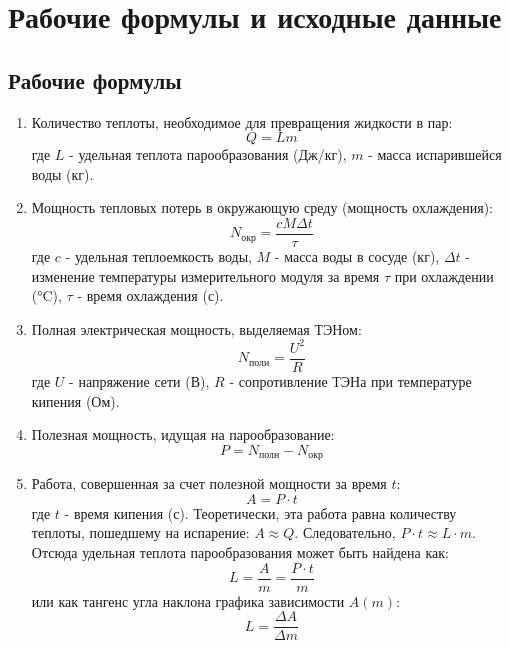 \documentclass[12pt, a4paper]{article}
\begin{document}
\section{Рабочие формулы и исходные данные}
\subsection*{Рабочие формулы}
\begin{enumerate}
    \item Количество теплоты, необходимое для превращения жидкости в пар:
    \begin{equation} \label{eq:Q_Lm}
        Q = Lm
    \end{equation}
    где $L$ - удельная теплота парообразования (Дж/кг), $m$ - масса испарившейся воды (кг).

    \item Мощность тепловых потерь в окружающую среду (мощность охлаждения):
    \begin{equation} \label{eq:N_okr}
        N_{\text{окр}} = \frac{cM\Delta t}{\tau}
    \end{equation}
    где $c$ - удельная теплоемкость воды, $M$ - масса воды в сосуде (кг), $\Delta t$ - изменение температуры измерительного модуля за время $\tau$ при охлаждении (°C), $\tau$ - время охлаждения (с).

    \item Полная электрическая мощность, выделяемая ТЭНом:
    \begin{equation} \label{eq:N_poln}
        N_{\text{полн}} = \frac{U^2}{R}
    \end{equation}
    где $U$ - напряжение сети (В), $R$ - сопротивление ТЭНа при температуре кипения (Ом).

    \item Полезная мощность, идущая на парообразование:
    \begin{equation} \label{eq:P}
        P = N_{\text{полн}} - N_{\text{окр}}
    \end{equation}

    \item Работа, совершенная за счет полезной мощности за время $t$:
    \begin{equation} \label{eq:A_Pt}
        A = P \cdot t
    \end{equation}
    где $t$ - время кипения (с).
    Теоретически, эта работа равна количеству теплоты, пошедшему на испарение: $A \approx Q$. Следовательно, $P \cdot t \approx L \cdot m$. Отсюда удельная теплота парообразования может быть найдена как:
    \begin{equation} \label{eq:L_At_m}
        L = \frac{A}{m} = \frac{P \cdot t}{m}
    \end{equation}
    или как тангенс угла наклона графика зависимости $A(m)$:
    \begin{equation} \label{eq:L_slope}
        L = \frac{\Delta A}{\Delta m}
    \end{equation}
\end{enumerate}
\end{document}
